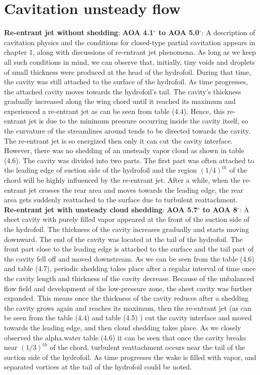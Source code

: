 \section{Cavitation unsteady flow}
\textbf{Re-entrant jet without shedding}:
 \textbf{AOA 4.1$^{\circ}$ to AOA 5.0$^{\circ}$}: A description of cavitation physics and the conditions for closed-type partial
cavitation appears in chapter 1, along with discussions of re-entrant jet phenomena. As long as we keep 
all such conditions in mind, we can observe that, initially, tiny voids and droplets of small thickness 
were produced at the head of the hydrofoil. During that time, the cavity was still attached to the surface 
of the hydrofoil. As time progresses, the attached cavity moves towards the hydrofoil's tail. The cavity's 
thickness gradually increased along the wing chord until it reached its maximum and experienced a re-entrant 
jet as can be  seen from table (4.4). Hence, this re-entrant jet is due to the minimum pressure occurring inside the cavity itself, 
so the curvature of the streamlines around  tends to be directed towards the cavity. The re-entrant jet is so energized then only it can cut the cavity interface.
However, there was no shedding of an unsteady vapor cloud as shown in table (4.6). The cavity was divided into two parts. 
The first part was often attached to the leading edge of  suction side of the hydrofoil and the region ${(1/4)}^{th}$ of the chord will be highly 
influenced by the re-entrant jet. After a while,  when the re-entrant jet crosses the rear area and moves towards the leading edge, 
the rear area gets suddenly reattached to the surface due to turbulent reattachment.\\
\textbf{Re-entrant jet with unsteady cloud shedding}:  
\textbf{AOA 5.7$^{\circ}$ to AOA 8$^{\circ}$}: A sheet cavity with purely filled vapor appeared at the front of the suction side of the hydrofoil. 
The thickness of the cavity increases gradually and starts moving downward. The end of the cavity 
was located at the tail of the hydrofoil. The front part close to the leading edge is attached to the surface and the 
tail part of the cavity fell off and moved downstream. As we can be seen from the table (4.6) and table (4.7),  periodic shedding takes 
place after a regular interval of time once the cavity length and thickness of the cavity decrease. 
Because of the unbalanced flow field and development of the low-pressure zone, the sheet cavity was further expanded.
 This means once the thickness of the cavity reduces after a shedding the 
cavity grows again and reaches its maximum, then the re-entrant jet (as can be seen from the table (4.4) and table (4.5) ) cut the cavity interface and 
moved towards the leading edge, and then cloud shedding takes place. As we closely observed the alpha.water table (4.6) it can be seen that once the cavity 
breaks near  $(1/3)^{th}$ of the chord,  turbulent reattachment occurs near the tail of the suction side of the hydrofoil.
As time progresses the wake is filled with vapor, and separated vortices at the tail of the hydrofoil could be noted.\\

